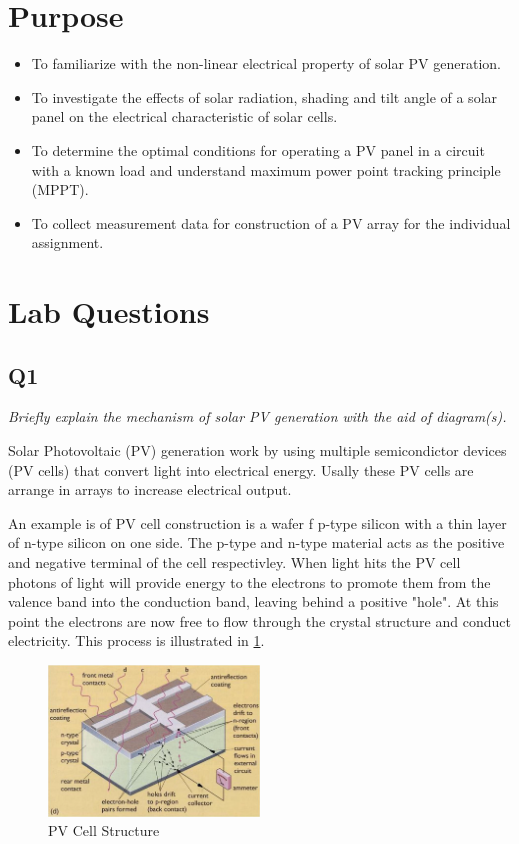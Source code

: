 \documentclass{article}
\begin{document}
	
	
	\tableofcontents
	\newpage
	\listoffigures
	\listoftables
	\newpage
	
	\section{Purpose}
		\begin{itemize}
			\item To familiarize with the non-linear electrical property of solar PV generation.
			\item To investigate the effects of solar radiation, shading and tilt angle of a solar panel on the electrical characteristic of solar cells.
			\item To determine the optimal conditions for operating a PV panel in a circuit with a known load and understand maximum power point tracking principle (MPPT).
			\item To collect measurement data for construction of a PV array for the individual assignment.
		\end{itemize}
	
	\section{Lab Questions}
	\subsection{Q1}
		\textit{Briefly explain the mechanism of solar PV generation with the aid of diagram(s).}
		
		Solar Photovoltaic (PV) generation work by using multiple semicondictor devices (PV cells) that convert light into electrical energy. Usally these PV cells are arrange in arrays to increase electrical output.
		
		An example is of PV cell construction is a wafer f p-type silicon with a thin layer of n-type silicon on one side. The p-type and n-type material acts as the positive and negative terminal of the cell respectivley. When light hits the PV cell photons of light will provide energy to the electrons to promote them from the valence band into the conduction band, leaving behind a positive "hole". At this point the electrons are now free to flow through the crystal structure and conduct electricity. This process is illustrated in \cref{fig:PVCellStructure}.
		
		\begin{figure}[H]
			\centering
			\includegraphics[width=0.5\textwidth]{PVCellStructure}
			\caption{PV Cell Structure}
			\label{fig:PVCellStructure}
		\end{figure}
	
\end{document}
